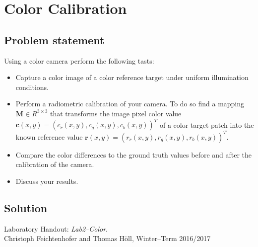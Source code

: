 \documentclass[
a4paper,     %
11pt         %
]{scrartcl}  %
\begin{document}
\section{Color Calibration}

\subsection{Problem statement}

Using a color camera perform the following tasts:

\begin{itemize}
 \item Capture a color image of a color reference target under uniform illumination conditions.
 \item Perform a radiometric calibration of your camera. To do so find a mapping $\bm{M} \in R^{3 \times 3}$ that transforms the image pixel color value $\bm{c}(x,y) = (c_r(x,y), c_g(x,y), c_b(x,y))^T$ of a color target patch into the known reference value $\bm{r}(x,y) = (r_r(x,y), r_g(x,y), r_b(x,y))^T$.
 \item Compare the color differences to the ground truth values before and after the calibration of the camera.
 \item Discuss your results.
\end{itemize}

\subsection{Solution}




\begin{thebibliography}{XX}
  Laboratory Handout: \textit{Lab2--Color}. \\
    Christoph Feichtenhofer and Thomas Höll, Winter--Term 2016/2017
\end{thebibliography}


% 

% 
\end{document}

